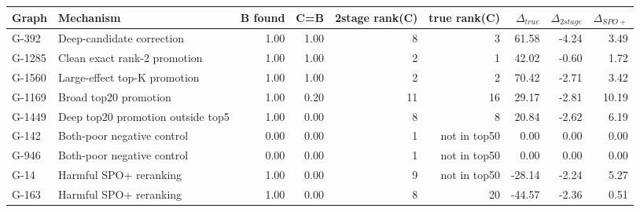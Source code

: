 \begin{tabular}{llrrrrrrr}
\toprule
Graph & Mechanism & B found & C=B & 2stage rank(C) & true rank(C) & $\Delta_{true}$ & $\Delta_{2stage}$ & $\Delta_{SPO+}$ \\
\midrule
G-392 & Deep-candidate correction & 1.00 & 1.00 & 8 & 3 & 61.58 & -4.24 & 3.49 \\
G-1285 & Clean exact rank-2 promotion & 1.00 & 1.00 & 2 & 1 & 42.02 & -0.60 & 1.72 \\
G-1560 & Large-effect top-K promotion & 1.00 & 1.00 & 2 & 2 & 70.42 & -2.71 & 3.42 \\
G-1169 & Broad top20 promotion & 1.00 & 0.20 & 11 & 16 & 29.17 & -2.81 & 10.19 \\
G-1449 & Deep top20 promotion outside top5 & 1.00 & 0.00 & 8 & 8 & 20.84 & -2.62 & 6.19 \\
G-142 & Both-poor negative control & 0.00 & 0.00 & 1 & not in top50 & 0.00 & 0.00 & 0.00 \\
G-946 & Both-poor negative control & 0.00 & 0.00 & 1 & not in top50 & 0.00 & 0.00 & 0.00 \\
G-14 & Harmful SPO+ reranking & 1.00 & 0.00 & 9 & not in top50 & -28.14 & -2.24 & 5.27 \\
G-163 & Harmful SPO+ reranking & 1.00 & 0.00 & 8 & 20 & -44.57 & -2.36 & 0.51 \\
\bottomrule
\end{tabular}
